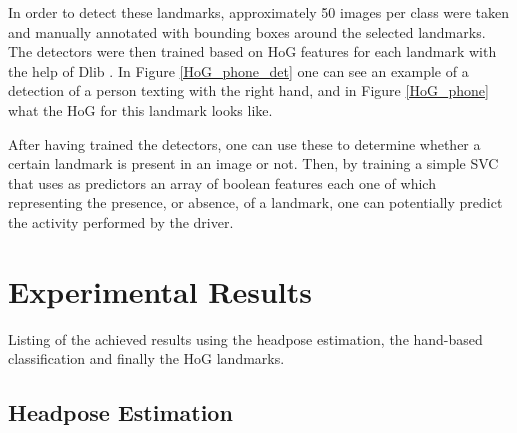 \documentclass[10pt,twocolumn,letterpaper]{article}
\begin{document}
In order to detect these landmarks, approximately 50 images per class were taken and manually annotated with bounding boxes around the selected landmarks. The detectors were then trained based on HoG features for each landmark with the help of Dlib \cite{dlib09}. In Figure \ref{HoG_phone_det} one can see an example of a detection of a person texting with the right hand, and in Figure \ref{HoG_phone} what the HoG for this landmark looks like.

After having trained the detectors, one can use these to determine whether a certain landmark is present in an image or not. Then, by training a simple SVC that uses as predictors an array of boolean features each one of which representing the presence, or absence, of a landmark, one can potentially predict the activity performed by the driver.











\section{Experimental Results}
Listing of the achieved results using the headpose estimation, the hand-based classification and finally the HoG landmarks.
\subsection{Headpose Estimation}
\end{document}
